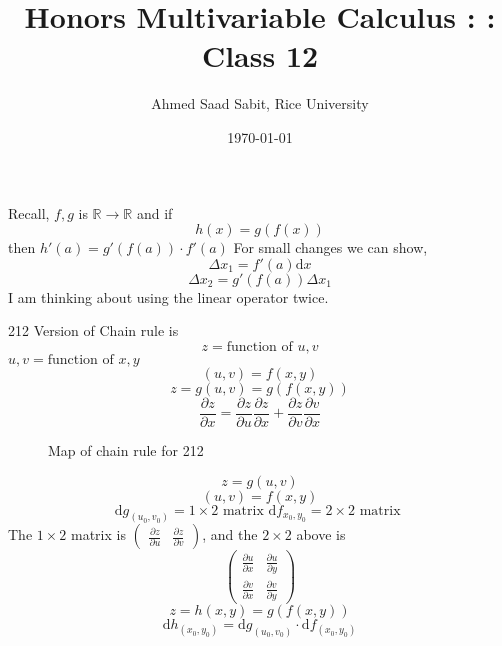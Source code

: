 \documentclass[letter]{article}
\title{Honors Multivariable Calculus : : Class 12}
\author{Ahmed Saad Sabit, Rice University}
\date{\today}
\begin{document}
\maketitle
{}

Recall, $f,g$ is $\mathbb{R}\to \mathbb{R}$ and if 
\[
h(x) = g(f(x))
\] then 
$h'(a) = g'(f(a)) \cdot f'(a)$
For small changes we can show,
\[
\Delta x_1 = f'(a) \mathrm{d} x
\] 
\[
\Delta x_2 = g'(f(a)) \Delta x_1
\]
I am thinking about using the linear operator twice. 

212 Version of Chain rule is
\[
z = \text{function of } u, v
\] 
$u,v = \text{function of } x, y$ 
\[
	(u,v) = f(x,y)
\] 
\[
z = g(u,v) = g(f(x,y))
\] 
\[
\frac{\partial z}{\partial x} = 
\frac{\partial z}{\partial u} 
\frac{\partial z}{\partial x} + 
\frac{\partial z}{\partial v} 
\frac{\partial v}{\partial x}
\] 
\begin{figure}[ht]
    \centering
    \caption{Map of chain rule for 212}
    \label{fig:map-of-chain-rule-for-212}
\end{figure}

\[
z = g(u,v)
\] 
\[
	(u,v) = f(x,y)
\] 
\[
	\mathrm{d} g_{(u_0, v_0)} = 1 \times  2 \text{ matrix } \mathrm{d} f_{x_0,y_0} = 2\times 2 \text{ matrix } 
\]
The $1\times 2$ matrix is $\begin{pmatrix} \frac{\partial z}{ \partial u} & \frac{\partial z}{\partial v} \end{pmatrix} $, and the $2\times 2$ above is 
\[
	\begin{pmatrix} \frac{\partial u}{\partial x} & \frac{\partial u}{\partial y} \\
	\frac{\partial v}{\partial x} & \frac{\partial v}{\partial y}\end{pmatrix} 
\] 
\[
z = h (x,y) = g(f(x,y))
\] 
\[
	\mathrm{d} h_{(x_0,y_0)} = \mathrm{d} g_{(u_0,v_0)} \cdot \mathrm{d} f_{(x_0,y_0)}  
\] 
\end{document}
